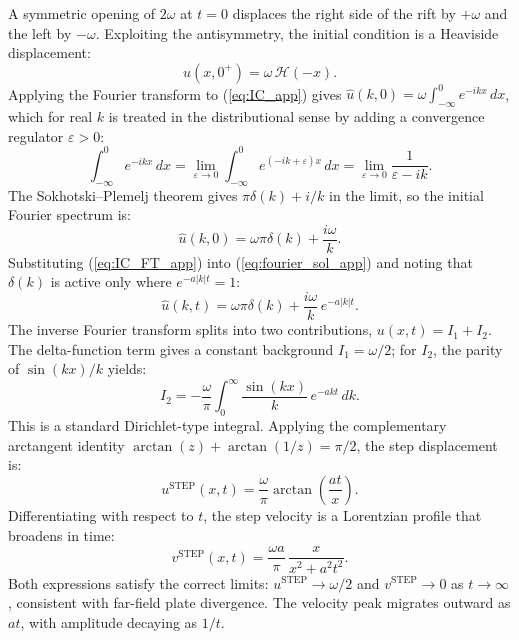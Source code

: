 \documentclass[12pt]{article}
\begin{document}
A symmetric opening of $2\omega$ at $t = 0$ displaces the right side of the rift
by $+\omega$ and the left by $-\omega$. Exploiting the antisymmetry, the initial
condition is a Heaviside displacement:
\begin{equation}
u(x,0^+) = \omega\,\mathcal{H}(-x).
\label{eq:IC_app}
\end{equation}
Applying the Fourier transform to (\ref{eq:IC_app}) gives
$\hat{u}(k,0) = \omega\int_{-\infty}^{0}e^{-ikx}\,dx$,
which for real $k$ is treated in the distributional sense by adding a
convergence regulator $\varepsilon > 0$:
\begin{equation*}
\int_{-\infty}^{0}e^{-ikx}\,dx
= \lim_{\varepsilon\to 0}\int_{-\infty}^{0}e^{(-ik+\varepsilon)x}\,dx
= \lim_{\varepsilon\to 0}\frac{1}{\varepsilon - ik}.
\end{equation*}
The Sokhotski--Plemelj theorem gives $\pi\delta(k) + i/k$ in the limit, so
the initial Fourier spectrum is:
\begin{equation}
\hat{u}(k,0) = \omega\pi\delta(k) + \frac{i\omega}{k}.
\label{eq:IC_FT_app}
\end{equation}
Substituting (\ref{eq:IC_FT_app}) into (\ref{eq:fourier_sol_app}) and noting that
$\delta(k)$ is active only where $e^{-a|k|t}=1$:
\begin{equation}
\hat{u}(k,t) = \omega\pi\delta(k) + \frac{i\omega}{k}\,e^{-a|k|t}.
\label{eq:evolved_app}
\end{equation}
The inverse Fourier transform splits into two contributions,
$u(x,t) = I_1 + I_2$. The delta-function term gives a constant background
$I_1 = \omega/2$; for $I_2$, the parity of $\sin(kx)/k$ yields:
\begin{equation}
I_2 = -\frac{\omega}{\pi}\int_0^{\infty}\frac{\sin(kx)}{k}\,e^{-akt}\,dk.
\end{equation}
This is a standard Dirichlet-type integral. Applying the complementary
arctangent identity $\arctan(z)+\arctan(1/z)=\pi/2$, the step displacement is:
\begin{equation}
u^{\text{STEP}}(x,t) = \frac{\omega}{\pi}\arctan\!\left(\frac{at}{x}\right).
\end{equation}
Differentiating with respect to $t$, the step velocity is a Lorentzian
profile that broadens in time:
\begin{equation}
v^{\text{STEP}}(x,t) = \frac{\omega a}{\pi}\,\frac{x}{x^2 + a^2t^2}.
\end{equation}
Both expressions satisfy the correct limits: $u^{\text{STEP}}\to\omega/2$ and
$v^{\text{STEP}}\to 0$ as $t\to\infty$, consistent with far-field plate
divergence. The velocity peak migrates outward as $at$, with amplitude decaying
as $1/t$.
\end{document}
